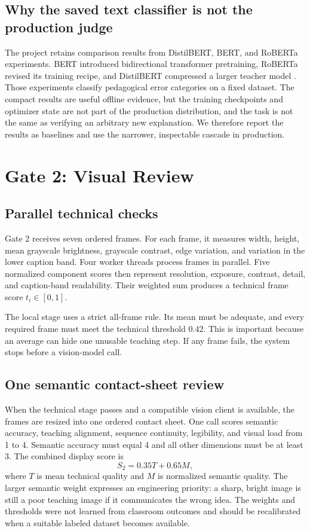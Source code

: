\documentclass[11pt]{article}
\theoremstyle{plain}
\theoremstyle{definition}
\begin{document}
\subsection{Why the saved text classifier is not the production judge}

The project retains comparison results from DistilBERT, BERT, and RoBERTa experiments. BERT introduced bidirectional transformer pretraining, RoBERTa revised its training recipe, and DistilBERT compressed a larger teacher model \citep{devlin2019bert,liu2019roberta,sanh2019distilbert}. Those experiments classify pedagogical error categories on a fixed dataset. The compact results are useful offline evidence, but the training checkpoints and optimizer state are not part of the production distribution, and the task is not the same as verifying an arbitrary new explanation. We therefore report the results as baselines and use the narrower, inspectable cascade in production.
\section{Gate 2: Visual Review}

\subsection{Parallel technical checks}

Gate 2 receives seven ordered frames. For each frame, it measures width, height, mean grayscale brightness, grayscale contrast, edge variation, and variation in the lower caption band. Four worker threads process frames in parallel. Five normalized component scores then represent resolution, exposure, contrast, detail, and caption-band readability. Their weighted sum produces a technical frame score $t_i\in[0,1]$.

The local stage uses a strict all-frame rule. Its mean must be adequate, and every required frame must meet the technical threshold $0.42$. This is important because an average can hide one unusable teaching step. If any frame fails, the system stops before a vision-model call.

\subsection{One semantic contact-sheet review}

When the technical stage passes and a compatible vision client is available, the frames are resized into one ordered contact sheet. One call scores semantic accuracy, teaching alignment, sequence continuity, legibility, and visual load from 1 to 4. Semantic accuracy must equal 4 and all other dimensions must be at least 3. The combined display score is
\begin{equation}
  S_2=0.35T+0.65M,
  \label{eq:gate2}
\end{equation}
where $T$ is mean technical quality and $M$ is normalized semantic quality. The larger semantic weight expresses an engineering priority: a sharp, bright image is still a poor teaching image if it communicates the wrong idea. The weights and thresholds were not learned from classroom outcomes and should be recalibrated when a suitable labeled dataset becomes available.
\end{document}
